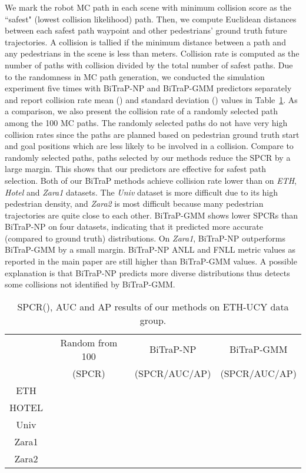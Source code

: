\documentclass[letterpaper, 10 pt, conference]{ieeeconf}
\begin{document}
 We mark the robot MC path in each scene with minimum collision score as the ``safest" (lowest collision likelihood) path. Then, we compute Euclidean distances between each safest path waypoint and other pedestrians' ground truth future trajectories. A collision is tallied if the minimum distance between a path and any pedestrians in the scene is less than  meters. Collision rate is computed as the number of paths with collision divided by the total number of safest paths. Due to the randomness in MC path generation, we conducted the simulation experiment five times with BiTraP-NP and BiTraP-GMM predictors separately and report collision rate mean () and standard deviation () values in Table~\ref{tab:spcr_auc_ap}. As a comparison, we also present the collision rate of a randomly selected path among the 100 MC paths. The randomly selected paths do not have very high collision rates since the paths are planned based on pedestrian ground truth start and goal positions which are less likely to be involved in a collision. Compare to randomly selected paths, paths selected by our methods reduce the SPCR by a large margin. This shows that our predictors are effective for safest path selection. Both of our BiTraP methods achieve collision rate lower than  on \textit{ETH}, \textit{Hotel} and \textit{Zara1} datasets. The \textit{Univ} dataset is more difficult due to its high pedestrian density, and \textit{Zara2} is most difficult because many pedestrian trajectories are quite close to each other. 
BiTraP-GMM shows lower SPCRs than BiTraP-NP on four datasets, indicating that it predicted more accurate (compared to ground truth) distributions. On \textit{Zara1}, BiTraP-NP outperforms BiTraP-GMM by a small margin. BiTraP-NP ANLL and FNLL metric values as reported in the main paper are still higher than BiTraP-GMM values. A possible explanation is that BiTraP-NP predicts more diverse distributions thus detects some collisions not identified by BiTraP-GMM.

\begin{table}[h]
    \centering
        \caption{SPCR(), AUC and AP results of our methods on ETH-UCY data group.}
        \resizebox{.49 \textwidth}{!} {
    \begin{tabular}{c|c|c|c}
        \toprule
         & Random from 100 & BiTraP-NP & BiTraP-GMM \\
         & (SPCR) & (SPCR/AUC/AP) & (SPCR/AUC/AP) \\
        \midrule
        ETH &  & &  \\
        HOTEL &  &  &  \\
        Univ &  &  &  \\
        Zara1 &  &  &  \\
        Zara2 &  &  &  \\
        \bottomrule
    \end{tabular}}
    \label{tab:spcr_auc_ap}
\end{table}
\end{document}
